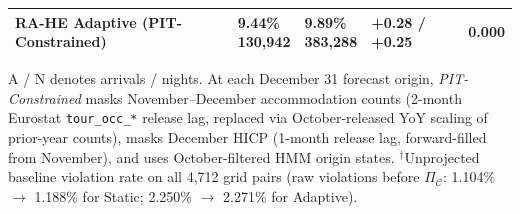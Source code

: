 \begin{table}[!htbp]
\begin{tabular}{>{\raggedright\arraybackslash}p{2.35cm}>{\centering\arraybackslash}p{1.65cm}>{\centering\arraybackslash}p{1.65cm}>{\centering\arraybackslash}p{1.2cm}>{\centering\arraybackslash}p{1.05cm}}
\textbf{RA-HE Adaptive (PIT-Constrained)} & \shortstack{\textbf{9.44\%}\\{\scriptsize \textbf{130,942}}} & \shortstack{\textbf{9.89\%}\\{\scriptsize \textbf{383,288}}} & \textbf{+0.28 / +0.25} & \textbf{0.000} \\
\bottomrule
\end{tabular}
\par\vspace{3pt}
\begin{minipage}{\columnwidth}
\scriptsize\raggedright A / N denotes arrivals / nights. At each December 31 forecast origin, \textit{PIT-Constrained} masks November--December accommodation counts (2-month Eurostat \texttt{tour\_occ\_*} release lag, replaced via October-released YoY scaling of prior-year counts), masks December HICP (1-month release lag, forward-filled from November), and uses October-filtered HMM origin states. $^\dagger$Unprojected baseline violation rate on all 4,712 grid pairs (raw violations before $\Pi_{\mathcal{C}}$: 1.104\% $\to$ 1.188\% for Static; 2.250\% $\to$ 2.271\% for Adaptive).
\end{minipage}
\end{table}

